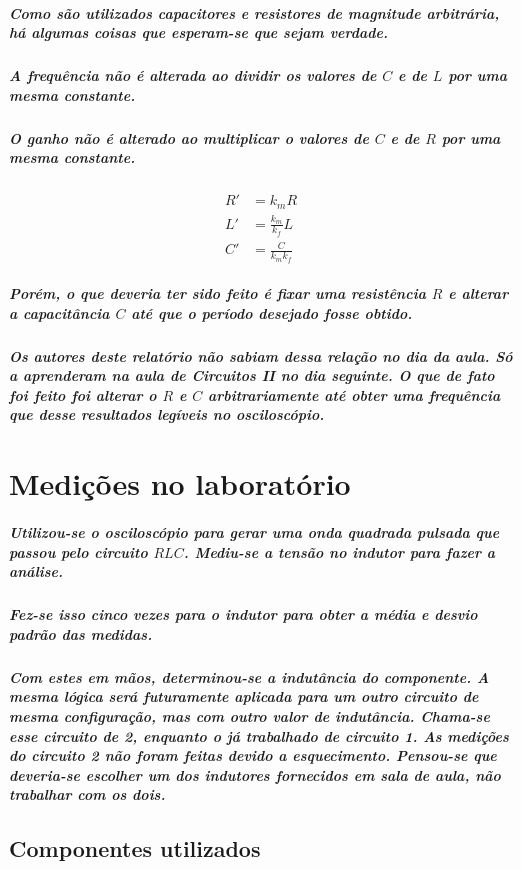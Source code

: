 \documentclass[12pt,twoside, a4paper, twocolumn]{article}
\begin{document}
\subparagraph*{Como são utilizados capacitores e resistores de magnitude arbitrária, há algumas coisas que esperam-se que sejam verdade.}


\subparagraph*{A frequência não é alterada ao dividir os valores de $C$ e de $L$ por uma mesma constante.}


\subparagraph*{O ganho não é alterado ao multiplicar o valores de $C$ e de $R$ por uma mesma constante.}
\subparagraph*{}
\begin{equation}
    \begin{aligned}
        R' & = k_m R             \\
        L' & = \frac{k_m}{k_f} L \\
        C' & = \frac{C}{k_m k_f}
    \end{aligned}
\end{equation}


\subparagraph*{Porém, o que deveria ter sido feito é fixar uma resistência $R$ e alterar a capacitância $C$ até que o período desejado fosse obtido.}


\subparagraph*{Os autores deste relatório não sabiam dessa relação no dia da aula. Só a aprenderam na aula de Circuitos II no dia seguinte. O que de fato foi feito foi alterar o $R$ e $C$ arbitrariamente até obter uma frequência que desse resultados legíveis no osciloscópio.}


\section{Medições no laboratório}


\subparagraph*{Utilizou-se o osciloscópio para gerar uma onda quadrada pulsada que passou pelo circuito $RLC$. Mediu-se a tensão no indutor para fazer a análise.}


\subparagraph*{Fez-se isso cinco vezes para o indutor para obter a média e desvio padrão das medidas.}


\subparagraph*{Com estes em mãos, determinou-se a indutância do componente. A mesma lógica será futuramente aplicada para um outro circuito de mesma configuração, mas com outro valor de indutância. Chama-se esse circuito de 2, enquanto o já trabalhado de circuito 1. As medições do circuito 2 não foram feitas devido a esquecimento. Pensou-se que deveria-se escolher um dos indutores fornecidos em sala de aula, não trabalhar com os dois.}


\subsection{Componentes utilizados}
\end{document}
